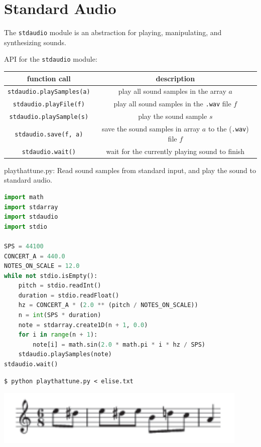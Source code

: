 \documentclass[8pt,a4paper,compress,handout]{beamer}
\begin{document}
\section{Standard Audio}
\begin{frame}[fragile]
The \lstinline{stdaudio} module is an abstraction for playing, manipulating, and synthesizing sounds.

\bigskip

API for the \lstinline{stdaudio} module:
\begin{center}
\begin{tabular}{cc}
function call & description \\ \hline
\lstinline$stdaudio.playSamples(a)$ & play all sound samples in the array $a$ \\
\lstinline$stdaudio.playFile(f)$ & play all sound samples in the \lstinline$.wav$ file $f$ \\
\lstinline$stdaudio.playSample(s)$ & play the sound sample $s$ \\
\lstinline$stdaudio.save(f, a)$ & save the sound samples in array $a$ to the (\lstinline$.wav$) file $f$ \\
\lstinline$stdaudio.wait()$ & wait for the currently playing sound to finish
\end{tabular} 
\end{center}
\end{frame}

\begin{frame}[fragile]
\begin{framed}
\tiny playthattune.py: Read sound samples from standard input, and play the sound to standard audio.
\end{framed}

\begin{lstlisting}[language=Python]
import math
import stdarray
import stdaudio
import stdio

SPS = 44100
CONCERT_A = 440.0
NOTES_ON_SCALE = 12.0
while not stdio.isEmpty():
    pitch = stdio.readInt()
    duration = stdio.readFloat()
    hz = CONCERT_A * (2.0 ** (pitch / NOTES_ON_SCALE))
    n = int(SPS * duration)
    note = stdarray.create1D(n + 1, 0.0)
    for i in range(n + 1):
        note[i] = math.sin(2.0 * math.pi * i * hz / SPS)
    stdaudio.playSamples(note)
stdaudio.wait()
\end{lstlisting}

\begin{minipage}{150pt}
\begin{lstlisting}[language={}]
$ python playthattune.py < elise.txt
\end{lstlisting}
\end{minipage}%
\begin{minipage}{150pt}
\hfill \includegraphics[scale=0.5]{figures/furelise.pdf}
\end{minipage}
\end{frame}
\end{document}
